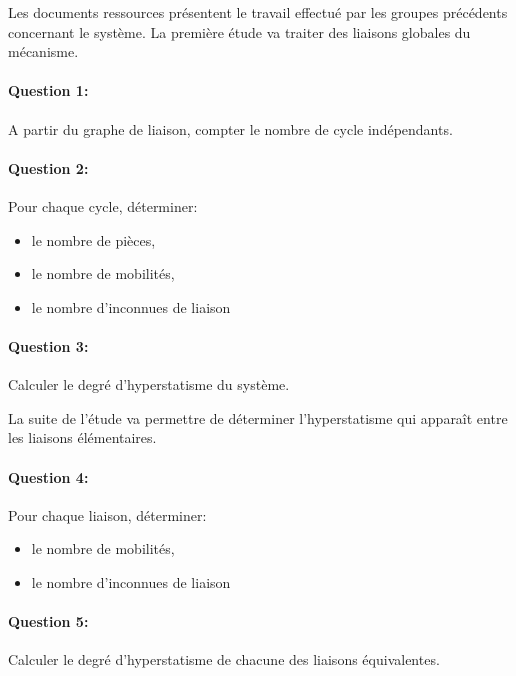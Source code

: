 

\ifdef{\public}{\cleardoublepage}{}



Les documents ressources présentent le travail effectué par les groupes précédents concernant le système. La première étude va traiter des liaisons globales du mécanisme.

\paragraph{Question 1:} A partir du graphe de liaison, compter le nombre de cycle indépendants.

\paragraph{Question 2:} Pour chaque cycle, déterminer: 
 \begin{itemize}
  \item le nombre de pièces,
  \item le nombre de mobilités,
  \item le nombre d'inconnues de liaison
\end{itemize}

\paragraph{Question 3:} Calculer le degré d'hyperstatisme du système.

La suite de l'étude va permettre de déterminer l'hyperstatisme qui apparaît entre les liaisons élémentaires.

\paragraph{Question 4:} Pour chaque liaison, déterminer: 
 \begin{itemize}
  \item le nombre de mobilités,
  \item le nombre d'inconnues de liaison
\end{itemize}

\paragraph{Question 5:} Calculer le degré d'hyperstatisme de chacune des liaisons équivalentes.

